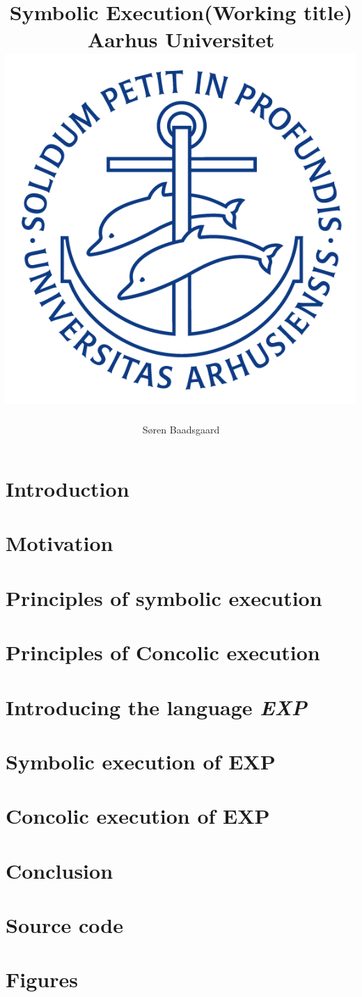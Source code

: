 \documentclass[]{report}
\title{
	\textbf{Symbolic Execution(Working title)}\\
	{\large Aarhus Universitet}\\
	{\includegraphics[scale=0.5]{ausegl_blaa.png}}	
	}
\author{Søren Baadsgaard}
\newcommand{\explanguage}{\textsl{EXP }}
\begin{document}
\maketitle

\begin{abstract}
\end{abstract}

\tableofcontents

\chapter{Introduction}
	
	
\chapter{Motivation}
	
\chapter{Principles of symbolic execution}
	

\chapter{Principles of Concolic execution}

\chapter{Introducing the language \explanguage}
	
\chapter{Symbolic execution of EXP}
\chapter{Concolic execution of EXP}

\chapter{Conclusion}
	

\appendix

\chapter{Source code}

\chapter{Figures}



\end{document}
